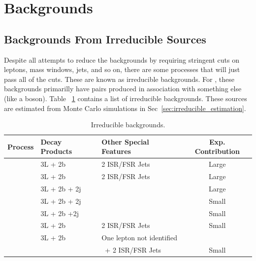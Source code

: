 	\section{Backgrounds}
	\label{sec:background_sources}
	
	
	        		\subsection{Backgrounds From Irreducible Sources} 
	Despite all attempts to reduce the backgrounds by requiring stringent cuts on leptons, mass windows, jets, and so on, there are some processes that will just pass all of the cuts. These are known as irreducible backgrounds. For \ttZ, these backgrounds primarilly have \ttbar pairs produced in association with something else (like a boson). Table ~\ref{tab:irreducible_bkg} contains a list of irreducible backgrounds. These sources are estimated from Monte Carlo simulations in Sec~\ref{sec:irreducible_estimation}.
	\begin{table}[hbt]
	\begin{center}
	\begin{tabular}{l|ll|c}\hline\hline %
	Process & Decay Products & Other Special Features & Exp. Contribution\\
	\hline
	\ttW & 3L + 2b& 2 ISR/FSR Jets& Large\\
	\tbZ & 3L + 2b& 2 ISR/FSR Jets & Large\\
	\ttH & 3L + 2b + 2j & & Large \\
	\ttG & 3L + 2b + 2j & & Small \\
	\ttWW & 3L + 2b +2j& & Small\\
	\WZZ & 3L + 2b & 2 ISR/FSR Jets & Small\\
	\ZZZ & 3L + 2b & One lepton not identified\\ 
	         &               & \ + 2 ISR/FSR Jets & Small\\
	
	\hline \hline
	\end{tabular}
	\caption{\label{tab:irreducible_bkg} Irreducible backgrounds.}
	\end{center}
	\end{table}
	
	
	
	
